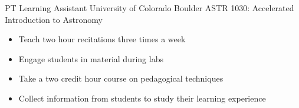     {PT}
    {Learning Assistant}
    {University of Colorado Boulder}
    {ASTR 1030: Accelerated Introduction to Astronomy}
    {\begin{itemize}
    \setlength\itemsep{0.1em}
        \item Teach two hour recitations three times a week
        \item Engage students in material during labs
        \item Take a two credit hour course on pedagogical techniques
        \item Collect information from students to study their learning
            experience
    \end{itemize}
}
